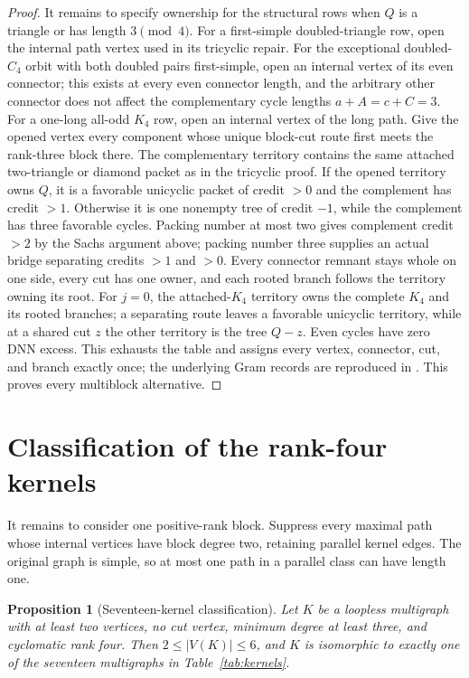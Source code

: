 \documentclass[11pt]{article}
\newtheorem{proposition}[theorem]{Proposition}
\theoremstyle{remark}
\begin{document}
\begin{proof}
It remains to specify ownership for the structural rows when $Q$ is a triangle
or has length $3\pmod4$.  For a first-simple doubled-triangle row, open the
internal path vertex used in its tricyclic repair.  For the exceptional
doubled-$C_4$ orbit with both doubled pairs first-simple, open an internal
vertex of its even connector; this exists at every even connector length, and
the arbitrary other connector does not affect the complementary cycle lengths
$a+A=c+C=3$.  For a one-long all-odd $K_4$ row, open an internal vertex of the
long path.  Give the
opened vertex every component whose unique block-cut route first meets the
rank-three block there.  The complementary territory contains the same
attached two-triangle or diamond packet as in the tricyclic proof.  If the
opened territory owns $Q$, it is a favorable unicyclic packet of credit $>0$
and the complement has credit $>1$.  Otherwise it is one nonempty tree of
credit $-1$, while the complement has three favorable cycles.  Packing number
at most two gives complement credit $>2$ by the Sachs argument above; packing
number three supplies an actual bridge separating credits $>1$ and $>0$.
Every connector remnant stays whole on one side, every cut has one owner, and
each rooted branch follows the territory owning its root.  For $j=0$, the
attached-$K_4$ territory owns the complete $K_4$ and its rooted branches; a
separating route leaves a favorable unicyclic territory, while at a shared cut
$z$ the other territory is the tree $Q-z$.  Even cycles have zero DNN excess.
This exhausts the table and assigns every vertex, connector, cut, and branch
exactly once; the underlying Gram records are reproduced in
\cite{RankThreeCycle}.  This proves every multiblock alternative.
\end{proof}

\section{Classification of the rank-four kernels}

It remains to consider one positive-rank block.  Suppress every maximal path
whose internal vertices have block degree two, retaining parallel kernel
edges.  The original graph is simple, so at most one path in a parallel class
can have length one.

\begin{proposition}[Seventeen-kernel classification]\label{prop:kernels}
Let $K$ be a loopless multigraph with at least two vertices, no cut vertex,
minimum degree at least three, and cyclomatic rank four.  Then
$2\leq|V(K)|\leq6$, and $K$ is isomorphic to exactly one of the seventeen
multigraphs in Table~\ref{tab:kernels}.
\end{proposition}
\end{document}
